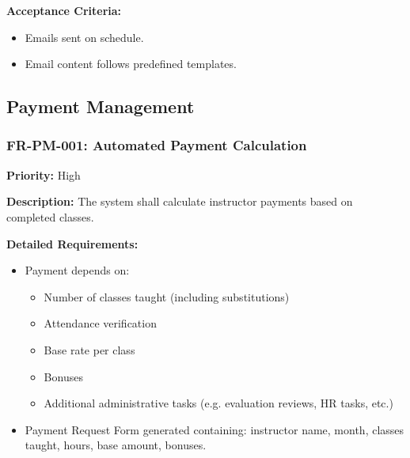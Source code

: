 \textbf{Acceptance Criteria:}
\begin{itemize}
    \item Emails sent on schedule.
    \item Email content follows predefined templates.
\end{itemize}





\subsection{Payment Management}

\subsubsection{FR-PM-001: Automated Payment Calculation}
\textbf{Priority:} High  

\textbf{Description:} The system shall calculate instructor payments based on completed classes.

\textbf{Detailed Requirements:}
\begin{itemize}
    \item Payment depends on:
    \begin{itemize}
        \item Number of classes taught (including substitutions)
        \item Attendance verification
        \item Base rate per class
        \item Bonuses
        \item Additional administrative tasks (e.g. evaluation reviews, HR tasks, etc.)
    \end{itemize}
    \item Payment Request Form generated containing: instructor name, month, classes taught, hours, base amount, bonuses.
\end{itemize}

